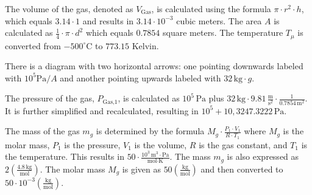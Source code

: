 The volume of the gas, denoted as \( V_{\text{Gas}} \), is calculated using the formula \( \pi \cdot r^2 \cdot h \), which equals \( 3.14 \cdot 1 \) and results in \( 3.14 \cdot 10^{-3} \) cubic meters. The area \( A \) is calculated as \( \frac{1}{4} \cdot \pi \cdot d^2 \) which equals \( 0.7854 \) square meters. The temperature \( T_{\mu} \) is converted from \(-500^\circ \text{C}\) to \( 773.15 \) Kelvin.

There is a diagram with two horizontal arrows: one pointing downwards labeled with \( 10^5 \text{Pa} / A \) and another pointing upwards labeled with \( 32 \, \text{kg} \cdot g \).

The pressure of the gas, \( P_{\text{Gas,1}} \), is calculated as \( 10^5 \, \text{Pa} \) plus \( 32 \, \text{kg} \cdot 9.81 \, \frac{\text{m}}{\text{s}^2} \cdot \frac{1}{0.7854 \, \text{m}^2} \). It is further simplified and recalculated, resulting in \( 10^5 + 10,3247.3222 \, \text{Pa} \).

The mass of the gas \( m_g \) is determined by the formula \( M_g \cdot \frac{P_1 \cdot V_1}{R \cdot T_1} \) where \( M_g \) is the molar mass, \( P_1 \) is the pressure, \( V_1 \) is the volume, \( R \) is the gas constant, and \( T_1 \) is the temperature. This results in \( 50 \cdot \frac{10^3 \, \text{m}^3 \cdot \text{Pa}}{\text{mol} \cdot \text{K}} \). The mass \( m_g \) is also expressed as \( 2 \left( \frac{4.8 \, \text{kg}}{\text{mol}} \right) \). The molar mass \( M_g \) is given as \( 50 \left( \frac{\text{kg}}{\text{mol}} \right) \) and then converted to \( 50 \cdot 10^{-3} \left( \frac{\text{kg}}{\text{mol}} \right) \).